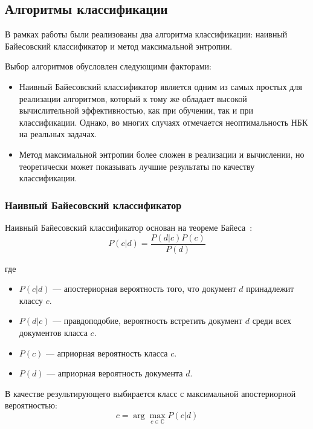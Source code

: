 \subsection{Алгоритмы классификации}

В рамках работы были реализованы два алгоритма классификации: наивный Байесовский классификатор и метод максимальной энтропии.

Выбор алгоритмов обусловлен следующими факторами:
\begin{itemize}

\item 
Наивный Байесовский классификатор является одним из
самых простых для реализации алгоритмов, который
к тому же обладает высокой вычислительной эффективностью,
как при обучении, так и при классификации. Однако, во многих
случаях отмечается неоптимальность НБК на реальных задачах.

\item
Метод максимальной энтропии более сложен в реализации и
вычислении, но теоретически может показывать лучшие
 результаты по качеству классификации. 

\end{itemize}

\subsubsection{Наивный Байесовский классификатор}
Наивный Байесовский классификатор основан на теореме Байеса~\cite{naive_bayes}:
\begin{equation}
P(c | d) = \frac{P(d | c) P(c)}{P(d)}
\end{equation}

где
\begin{itemize}

\item
$P(c | d)$ --- апостериорная вероятность того, что документ $d$ принадлежит классу $c$.

\item
$P(d | c)$ --- правдоподобие, вероятность встретить документ $d$ среди всех документов класса $c$.

\item
$P(c)$ --- априорная вероятность класса $c$. 

\item
$P(d)$ --- априорная вероятность документа $d$. 

\end{itemize}

В качестве результирующего выбирается класс с максимальной апостериорной вероятностью:
\begin{equation}
c = \arg\!\underset{c \in \mathbb{C}}{\max} P(c | d)
\end{equation}

